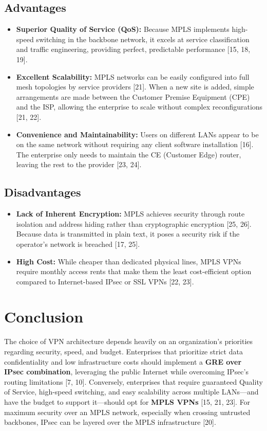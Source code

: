 \documentclass[conference]{IEEEtran}
\begin{document}
\subsection{Advantages}
\begin{itemize}
    \item \textbf{Superior Quality of Service (QoS):} Because MPLS implements high-speed switching in the backbone network, it excels at service classification and traffic engineering, providing perfect, predictable performance [15, 18, 19].
    \item \textbf{Excellent Scalability:} MPLS networks can be easily configured into full mesh topologies by service providers [21]. When a new site is added, simple arrangements are made between the Customer Premise Equipment (CPE) and the ISP, allowing the enterprise to scale without complex reconfigurations [21, 22].
    \item \textbf{Convenience and Maintainability:} Users on different LANs appear to be on the same network without requiring any client software installation [16]. The enterprise only needs to maintain the CE (Customer Edge) router, leaving the rest to the provider [23, 24].
\end{itemize}

\subsection{Disadvantages}
\begin{itemize}
    \item \textbf{Lack of Inherent Encryption:} MPLS achieves security through route isolation and address hiding rather than cryptographic encryption [25, 26]. Because data is transmitted in plain text, it poses a security risk if the operator's network is breached [17, 25].
    \item \textbf{High Cost:} While cheaper than dedicated physical lines, MPLS VPNs require monthly access rents that make them the least cost-efficient option compared to Internet-based IPsec or SSL VPNs [22, 23].
\end{itemize}

\section{Conclusion}
The choice of VPN architecture depends heavily on an organization's priorities regarding security, speed, and budget. Enterprises that prioritize strict data confidentiality and low infrastructure costs should implement a \textbf{GRE over IPsec combination}, leveraging the public Internet while overcoming IPsec's routing limitations [7, 10]. Conversely, enterprises that require guaranteed Quality of Service, high-speed switching, and easy scalability across multiple LANs—and have the budget to support it—should opt for \textbf{MPLS VPNs} [15, 21, 23]. For maximum security over an MPLS network, especially when crossing untrusted backbones, IPsec can be layered over the MPLS infrastructure [20].
\end{document}

